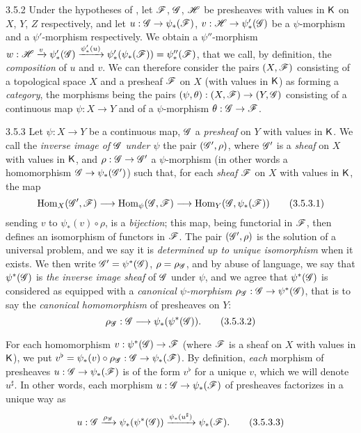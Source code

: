 \begin{env}{3.5.2}
\label{env-0.3.5.2}
Under the hypotheses of , let $\mathscr{F}$, $\mathscr{G}$, $\mathscr{H}$ be
presheaves with values in $\mathsf{K}$ on $X$, $Y$, $Z$ respectively, and let
$u:\mathscr{G}\to\psi_*(\mathscr{F})$, $v:\mathscr{H}\to\psi_*'(\mathscr{G})$ be a $\psi$-morphism
and a $\psi'$-morphism respectively. We obtain a $\psi''$-morphism
$w:\mathscr{H}\xrightarrow{v}\psi_*'(\mathscr{G})\xrightarrow{\psi_*'(u)}
  \psi_*'(\psi_*(\mathscr{F}))=\psi_*''(\mathscr{F})$, that we call, by definition, the
\emph{composition} of $u$ and $v$. We can therefore consider the pairs
$(X,\mathscr{F})$ consisting of a topological space $X$ and a presheaf $\mathscr{F}$ on
$X$ (with values in $\mathsf{K}$) as forming a \emph{category}, the morphisms being the
pairs $(\psi,\theta):(X,\mathscr{F})\to(Y,\mathscr{G})$ consisting of a continuous map
$\psi:X\to Y$ and of a $\psi$-morphism $\theta:\mathscr{G}\to\mathscr{F}$.
\end{env}

\begin{env}{3.5.3}
\label{env-0.3.5.3}
Let $\psi:X\to Y$ be a continuous map, $\mathscr{G}$ a \emph{presheaf} on $Y$ with
values in $\mathsf{K}$. We call the \emph{inverse image of $\mathscr{G}$ under $\psi$} the
pair $(\mathscr{G}',\rho)$, where $\mathscr{G}'$ is a \emph{sheaf} on $X$ with values in
$\mathsf{K}$, and $\rho:\mathscr{G}\to\mathscr{G}'$ a $\psi$-morphism (in other words a
homomorphism $\mathscr{G}\to\psi_*(\mathscr{G}')$) such that, for each \emph{sheaf}
$\mathscr{F}$ on $X$ with values in $\mathsf{K}$, the map
\[
  {\mathop{\mathrm{Hom}}\nolimits}_X(\mathscr{G}',\mathscr{F})\longrightarrow{\mathop{\mathrm{Hom}}\nolimits}_\psi(\mathscr{G},\mathscr{F})
  \longrightarrow{\mathop{\mathrm{Hom}}\nolimits}_Y(\mathscr{G},\psi_*(\mathscr{F}))
  \tag{3.5.3.1}
\]
sending $v$ to $\psi_*(v)\circ\rho$, is a \emph{bijection}; this map, being
functorial in $\mathscr{F}$, then defines an isomorphism of functors in $\mathscr{F}$. The
pair $(\mathscr{G}',\rho)$ is the solution of a universal problem, and we say it is
\emph{determined up to unique isomorphism} when it exists. We then write
$\mathscr{G}'=\psi^*(\mathscr{G})$, $\rho=\rho_\mathscr{G}$, and by abuse of language, we say
that $\psi^*(\mathscr{G})$ is \emph{the inverse image sheaf} of $\mathscr{G}$ under
$\psi$, and we agree that $\psi^*(\mathscr{G})$ is considered as equipped with a
\emph{canonical $\psi$-morphism $\rho_\mathscr{G}:\mathscr{G}\to\psi^*(\mathscr{G})$}, that is
to say the \emph{canonical homomorphism} of presheaves on $Y$:
\[
  \rho_\mathscr{G}:\mathscr{G}\longrightarrow\psi_*(\psi^*(\mathscr{G})).
  \tag{3.5.3.2}
\]

For each homomorphism $v:\psi^*(\mathscr{G})\to\mathscr{F}$ (where $\mathscr{F}$ is a sheaf on
$X$ with values in $\mathsf{K}$), we put
$v^\flat=\psi_*(v)\circ\rho_\mathscr{G}:\mathscr{G}\to\psi_*(\mathscr{F})$. By definition,
\emph{each} morphism of presheaves $u:\mathscr{G}\to\psi_*(\mathscr{F})$ is of the form
$v^\flat$ for a unique $v$, which we will denote $u^\sharp$. In other words,
each morphism $u:\mathscr{G}\to\psi_*(\mathscr{F})$ of presheaves factorizes in a unique
way as
\[
  u:\mathscr{G}\xrightarrow{\rho_\mathscr{G}}\psi_*(\psi^*(\mathscr{G}))
  \xrightarrow{\psi_*(u^\sharp)}\psi_*(\mathscr{F}).
  \tag{3.5.3.3}
\]
\end{env}

